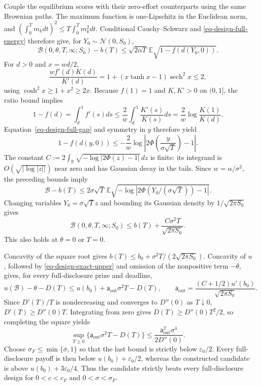 \documentclass[mnsc]{informs3}
\begin{document}
\begin{APPENDICES}
{Couple the equilibrium scores with their zero-effort counterparts using
the same Brownian paths. The maximum function is one-Lipschitz in the
Euclidean norm, and
$(\int_0^Tm_kdt)^2\leq T\int_0^Tm_k^2dt$. Conditional
Cauchy--Schwarz and \eqref{eq-design-full-energy} therefore give, for
$Y_0\sim\mathcal N(0,S_0)$,
\[
\mathcal B(0,\theta,T,\infty;S_0)-b(T)
\leq\sqrt{2\alpha T}\,
\mathbb E\sqrt{1-f(d(Y_0,0))}.
\]
For $d>0$ and $x=wd/2$,
\[
\frac{wf'(d)K(d)}{K'(d)}
=1+(x\tanh x-1)\operatorname{sech}^2x\leq2,
\]
using $\cosh^2x\geq1+x^2\geq2x$.
Because $f(1)=1$ and $K,K'>0$ on $(0,1]$, the ratio bound implies
\[
1-f(d)=\int_d^1f'(s)ds
\leq\frac2w\int_d^1\frac{K'(s)}{K(s)}ds
=\frac2w\log\frac{K(1)}{K(d)}.
\]
Equation~\eqref{eq-design-full-gap} and symmetry in $y$ therefore yield
\[
1-f(d(y,0))\leq-\frac2w
\log\left|2\Phi\!\left(\frac{y}{\sigma\sqrt T}\right)-1\right|.
\]
The constant $C:=2\int_{\mathbb R}\sqrt{-\log|2\Phi(z)-1|}\,dz$
is finite: its integrand is $O(\sqrt{|\log|z||})$ near zero and
has Gaussian decay in the tails. Since $w=\alpha/\sigma^2$, the preceding
bounds imply
\[
\mathcal B-b(T)
\leq2\sigma\sqrt T\,
\mathbb E\sqrt{-\log|2\Phi(Y_0/(\sigma\sqrt T))-1|}.
\]
Changing variables $Y_0=\sigma\sqrt Tz$ and bounding its Gaussian
density by $1/\sqrt{2\pi S_0}$ gives
\begin{equation}\label{eq-design-exact-upper}
\mathcal B(0,\theta,T,\infty;S_0)
\leq b(T)+\frac{C\sigma^2T}{\sqrt{2\pi S_0}}.
\end{equation}
This also holds at $\theta=0$ or $T=0$.

Concavity of the square root gives
$b(T)\leq b_0+\sigma^2T/(2\sqrt{2\pi S_0})$. Concavity of $u$, followed
by \eqref{eq-design-exact-upper} and omission of the nonpositive term
$-\theta$, gives, for every full-disclosure prize and deadline,
\[
u(\mathcal B)-\theta-D(T)
\leq u(b_0)+\mathsf a_{\mathrm{out}}\sigma^2T-D(T),\qquad
\mathsf a_{\mathrm{out}}=\frac{(C+1/2)u'(b_0)}{\sqrt{2\pi S_0}}.
\]
Since $D'(T)/T$ is nondecreasing and converges to $D''(0)$ as
$T\downarrow0$, $D'(T)\geq D''(0)T$. Integrating from zero gives
$D(T)\geq D''(0)T^2/2$, so completing the square yields
\[
\sup_{T\geq0}\{\mathsf a_{\mathrm{out}}\sigma^2T-D(T)\}
\leq\frac{\mathsf a_{\mathrm{out}}^2\sigma^4}{2D''(0)}.
\]
Choose $\sigma_F\leq\min\{\bar\sigma,1\}$ so that the last bound is
strictly below $\varepsilon_0/2$. Every full-disclosure payoff is then below
$u(b_0)+\varepsilon_0/2$, whereas the constructed candidate is above
$u(b_0)+3\varepsilon_0/4$. Thus the candidate strictly beats every
full-disclosure design for $0<c<c_F$ and $0<\sigma<\sigma_F$.

}
\end{APPENDICES}
\end{document}
